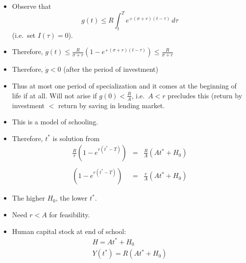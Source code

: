 \documentclass[12pt,compress,handout]{beamer}  %
\begin{document}
\begin{frame}
\begin{itemize}[<+->]
\item Observe that
  \begin{equation*}
  g(t) \leq R\int_t^T e^{+(\sigma +r)(t-\tau )}\,d\tau
  \end{equation*}
  (i.e.\ set $I(\tau) = 0$).

\item Therefore, $g(t) \leq \frac{R}{\sigma +r}\left(1- e^{+(\sigma
    +r)(t-\tau )} \right) \leq \frac{R}{\sigma + r}$

\item Therefore, $\dot{g} < 0$ (after the period of investment)

\item Thus at most one period of specialization and it comes at the
    beginning of life if at all. Will not arise if $g(0) < \frac{R}{A}$,
    i.e.\ $A < r$ precludes this (return by investment $<$ return by saving
    in lending market.
\item This is a model of schooling.
\end{itemize}
\end{frame}


\begin{frame}
\begin{itemize}[<+->]
\item Therefore, $t^{*}$ is solution from
  \begin{eqnarray*}
    \frac{R}{r}\left(1- e^{r(t^{*}-T)}\right) &=& \frac{R}{A}(At^{*}+H_{0}) \\
    \\
    \left(1- e^{r(t^{*}-T)}\right) &=& \frac{r}{A}(At^{*}+H_{0})
  \end{eqnarray*}

\item The higher $H_{0}$, the lower $t^{*}$.
\item Need $r<A$ for feasibility.

\item Human capital stock at end of school:
  \begin{gather*}
    H = At^{*}+H_{0} \\
    Y(t^{*}) = R(At^{*}+H_{0})
  \end{gather*}
\end{itemize}
\end{frame}
\end{document}
